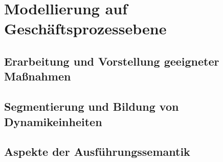 \section{Modellierung auf Geschäftsprozessebene}\label{sec:modellierung}



\subsection{Erarbeitung und Vorstellung geeigneter Maßnahmen}

\subsection{Segmentierung und Bildung von Dynamikeinheiten}

\subsection{Aspekte der Ausführungssemantik}
